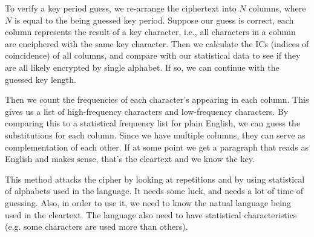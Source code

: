 \documentclass{article}
\begin{document}
\par{To verify a key period guess, we re-arrange the ciphertext into $N$ columns, where $N$ is equal to the being guessed key period. Suppose our guess is correct, each column represents the result of a key character, i.e., all characters in a column are enciphered with the same key character. Then we calculate the ICs (indices of coincidence) of all columns, and compare with our statistical data to see if they are all likely encrypted by single alphabet. If so, we can continue with the guessed key length.}

\par{Then we count the frequencies of each character's appearing in each column. This gives us a list of high-frequency characters and low-frequency characters. By comparing this to a statistical frequency list for plain English, we can guess the substitutions for each column. Since we have multiple columns, they can serve as complementation of each other. If at some point we get a paragraph that reads as English and makes sense, that's the cleartext and we know the key.}

\par{This method attacks the cipher by looking at repetitions and by using statistical of alphabets used in the language. It needs some luck, and needs a lot of time of guessing. Also, in order to use it, we need to know the natual language being used in the cleartext. The language also need to have statistical characteristics (e.g. some characters are used more than others).}
\end{document}
